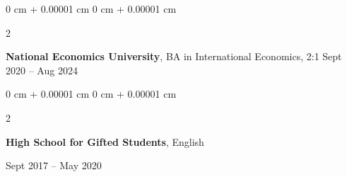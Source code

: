 \documentclass[10pt, letterpaper]{article}
\newenvironment{highlights}{
    \begin{itemize}[
        topsep=0.10 cm,
        parsep=0.10 cm,
        partopsep=0pt,
        itemsep=0pt,
        leftmargin=0 cm + 10pt
    ]
}{
    \end{itemize}
}
\newenvironment{onecolentry}{
    \begin{adjustwidth}{
        0 cm + 0.00001 cm
    }{
        0 cm + 0.00001 cm
    }
}{
    \end{adjustwidth}
}
\newenvironment{twocolentry}[2][]{
    \onecolentry
    \def\secondColumn{#2}
    \setcolumnwidth{\fill, 4.5 cm}
    \begin{paracol}{2}
}{
    \switchcolumn \raggedleft \secondColumn
    \end{paracol}
    \endonecolentry
}
\begin{document}

\begin{twocolentry}{
    Sept 2020 – Aug 2024
}
    \textbf{National Economics University}, BA in International Economics, 2:1\end{twocolentry}



\begin{twocolentry}{
    Sept 2017 – May 2020
}
    \textbf{High School for Gifted Students}, English
\end{twocolentry}

\end{document}
